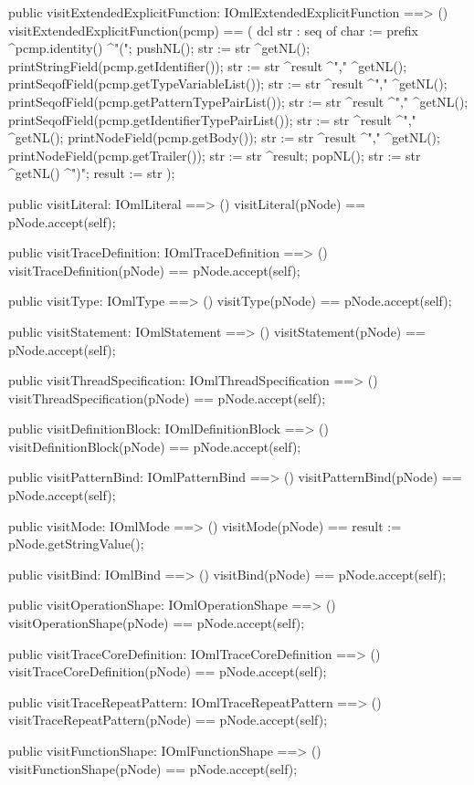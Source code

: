 \begin{vdm_al}
  public visitExtendedExplicitFunction: IOmlExtendedExplicitFunction ==> ()
  visitExtendedExplicitFunction(pcmp) ==
    ( dcl str : seq of char := prefix ^pcmp.identity() ^"(";
      pushNL();
      str := str ^getNL();
      printStringField(pcmp.getIdentifier());
      str := str ^result ^"," ^getNL();
      printSeqofField(pcmp.getTypeVariableList());
      str := str ^result ^"," ^getNL();
      printSeqofField(pcmp.getPatternTypePairList());
      str := str ^result ^"," ^getNL();
      printSeqofField(pcmp.getIdentifierTypePairList());
      str := str ^result ^"," ^getNL();
      printNodeField(pcmp.getBody());
      str := str ^result ^"," ^getNL();
      printNodeField(pcmp.getTrailer());
      str := str ^result;
      popNL();
      str := str ^getNL() ^")";
      result := str );

  public visitLiteral: IOmlLiteral ==> ()
  visitLiteral(pNode) == pNode.accept(self);

  public visitTraceDefinition: IOmlTraceDefinition ==> ()
  visitTraceDefinition(pNode) == pNode.accept(self);

  public visitType: IOmlType ==> ()
  visitType(pNode) == pNode.accept(self);

  public visitStatement: IOmlStatement ==> ()
  visitStatement(pNode) == pNode.accept(self);

  public visitThreadSpecification: IOmlThreadSpecification ==> ()
  visitThreadSpecification(pNode) == pNode.accept(self);

  public visitDefinitionBlock: IOmlDefinitionBlock ==> ()
  visitDefinitionBlock(pNode) == pNode.accept(self);

  public visitPatternBind: IOmlPatternBind ==> ()
  visitPatternBind(pNode) == pNode.accept(self);

  public visitMode: IOmlMode ==> ()
  visitMode(pNode) == result := pNode.getStringValue();

  public visitBind: IOmlBind ==> ()
  visitBind(pNode) == pNode.accept(self);

  public visitOperationShape: IOmlOperationShape ==> ()
  visitOperationShape(pNode) == pNode.accept(self);

  public visitTraceCoreDefinition: IOmlTraceCoreDefinition ==> ()
  visitTraceCoreDefinition(pNode) == pNode.accept(self);

  public visitTraceRepeatPattern: IOmlTraceRepeatPattern ==> ()
  visitTraceRepeatPattern(pNode) == pNode.accept(self);

  public visitFunctionShape: IOmlFunctionShape ==> ()
  visitFunctionShape(pNode) == pNode.accept(self);


\end{vdm_al}
